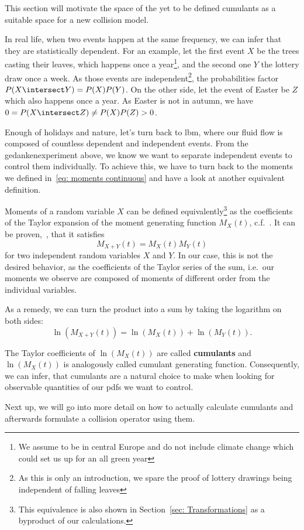 
This section will motivate the space of the yet to be defined cumulants as a suitable space for a new collision model.

In real life, when two events happen at the same frequency, we can infer that they are statistically dependent.
For an example, let the first event $X$ be the trees casting their leaves, which happens once a year\footnote{We
assume to be in central Europe and do not include climate change which could set us up for an all green year},
and the second one $Y$ the lottery draw once a week.
As those events are independent\footnote{As
this is only an introduction, we spare the proof of lottery drawings being independent of falling leaves},
the probabilities factor $P(X\intersect Y) = P(X)P(Y)$.
On the other side, let the event of Easter be $Z$ which also happens once a year.
As Easter is not in autumn, we have $0 = P(X\intersect Z) \neq P(X)P(Z) > 0$.

Enough of holidays and nature, let's turn back to \gls{lbm}, where our fluid flow is composed of countless dependent and independent events.
From the gedankenexperiment above, we know we want to separate independent events to control them individually.
To achieve this, we have to turn back to the moments we defined in~\eqref{eq: moments continuous} and have a look at another equivalent definition.

Moments of a random variable $X$ can be defined equivalently\footnote{This equivalence is also shown in Section~\ref{sec: Transformations} as a byproduct of our calculations.
} as the coefficients of the Taylor expansion of the moment generating function $M_X(t)$, c.f.~\cite{weissteinMGF}.
It can be proven,~\cite{weissteinMGF}, that it satisfies
\begin{equation}
\label{eq: moment generating function for independent variables}
  M_{X+Y}(t) = M_{X}(t)M_{Y}(t)
\end{equation}
for two independent random variables $X$ and $Y$.
In our case, this is not the desired behavior, as the coefficients of the Taylor series of the sum, i.e.\ our moments we observe are composed of moments of different order from the individual variables.

As a remedy, we can turn the product into a sum by taking the logarithm on both sides:
\begin{equation}
  \label{eq: cumulant generating function for independent variables}
  \ln(M_{X+Y}(t)) = \ln(M_{X}(t)) + \ln(M_{Y}(t)).
\end{equation}

The Taylor coefficients of $\ln(M_X(t))$ are called \textbf{cumulants} and $\ln(M_{X}(t))$ is analogously called cumulant generating function.
Consequently, we can infer, that cumulants are a natural choice to make when looking for observable quantities of our \glspl{pdf} we want to control.

Next up, we will go into more detail on how to actually calculate cumulants and afterwards formulate a collision operator using them.

